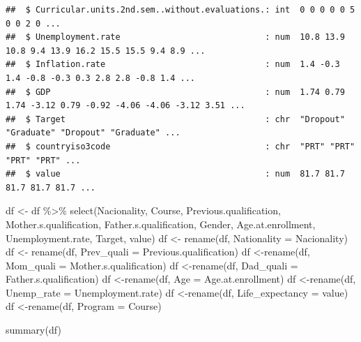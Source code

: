\documentclass[
]{article}
\newenvironment{Shaded}{\begin{snugshade}}{\end{snugshade}}
\newcommand{\AttributeTok}[1]{\textcolor[rgb]{0.77,0.63,0.00}{#1}}
\newcommand{\FunctionTok}[1]{\textcolor[rgb]{0.00,0.00,0.00}{#1}}
\newcommand{\NormalTok}[1]{#1}
\newcommand{\OtherTok}[1]{\textcolor[rgb]{0.56,0.35,0.01}{#1}}
\newcommand{\SpecialCharTok}[1]{\textcolor[rgb]{0.00,0.00,0.00}{#1}}
\begin{document}
\begin{verbatim}
##  $ Curricular.units.2nd.sem..without.evaluations.: int  0 0 0 0 0 5 0 0 2 0 ...
##  $ Unemployment.rate                             : num  10.8 13.9 10.8 9.4 13.9 16.2 15.5 15.5 9.4 8.9 ...
##  $ Inflation.rate                                : num  1.4 -0.3 1.4 -0.8 -0.3 0.3 2.8 2.8 -0.8 1.4 ...
##  $ GDP                                           : num  1.74 0.79 1.74 -3.12 0.79 -0.92 -4.06 -4.06 -3.12 3.51 ...
##  $ Target                                        : chr  "Dropout" "Graduate" "Dropout" "Graduate" ...
##  $ countryiso3code                               : chr  "PRT" "PRT" "PRT" "PRT" ...
##  $ value                                         : num  81.7 81.7 81.7 81.7 81.7 ...
\end{verbatim}

\begin{Shaded}
\begin{Highlighting}[]
\NormalTok{df }\OtherTok{\textless{}{-}}\NormalTok{ df }\SpecialCharTok{\%\textgreater{}\%} \FunctionTok{select}\NormalTok{(Nacionality, Course, Previous.qualification, Mother.s.qualification, Father.s.qualification, Gender, Age.at.enrollment, Unemployment.rate, Target, value)}
\NormalTok{df }\OtherTok{\textless{}{-}} \FunctionTok{rename}\NormalTok{(df, }\AttributeTok{Nationality =}\NormalTok{ Nacionality)}
\NormalTok{df }\OtherTok{\textless{}{-}} \FunctionTok{rename}\NormalTok{(df, }\AttributeTok{Prev\_quali =}\NormalTok{ Previous.qualification)}
\NormalTok{df }\OtherTok{\textless{}{-}}\FunctionTok{rename}\NormalTok{(df, }\AttributeTok{Mom\_quali =}\NormalTok{ Mother.s.qualification)}
\NormalTok{df }\OtherTok{\textless{}{-}}\FunctionTok{rename}\NormalTok{(df, }\AttributeTok{Dad\_quali =}\NormalTok{ Father.s.qualification)}
\NormalTok{df }\OtherTok{\textless{}{-}}\FunctionTok{rename}\NormalTok{(df, }\AttributeTok{Age =}\NormalTok{ Age.at.enrollment)}
\NormalTok{df }\OtherTok{\textless{}{-}}\FunctionTok{rename}\NormalTok{(df, }\AttributeTok{Unemp\_rate =}\NormalTok{ Unemployment.rate)}
\NormalTok{df }\OtherTok{\textless{}{-}}\FunctionTok{rename}\NormalTok{(df, }\AttributeTok{Life\_expectancy =}\NormalTok{ value)}
\NormalTok{df }\OtherTok{\textless{}{-}}\FunctionTok{rename}\NormalTok{(df, }\AttributeTok{Program =}\NormalTok{ Course)}

\FunctionTok{summary}\NormalTok{(df)}
\end{Highlighting}
\end{Shaded}
\end{document}

